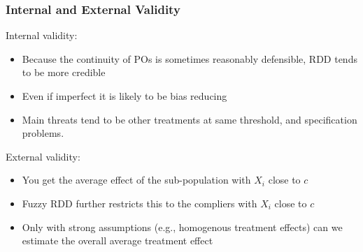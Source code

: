 \documentclass[xcolor=dvipsnames]{beamer}
\begin{document}
\begin{frame}
  \frametitle{Internal and External Validity}
  \small
   Internal validity:\\
  \footnotesize
  \begin{itemize}
  \item Because the continuity of POs is sometimes reasonably defensible, RDD tends to be more credible
  \item Even if imperfect it is likely to be bias reducing
  \item Main threats tend to be other treatments at same threshold, and specification problems.
  \end{itemize}
  \small
   External validity:\\
  \begin{itemize}
  \footnotesize
  	\item<3-> You get the average effect of the sub-population with $X_i$ close to $c$
	\item<3-> Fuzzy RDD further restricts this to the compliers with $X_i$ close to $c$
	\item<3-> Only with strong assumptions (e.g., homogenous treatment effects) can we estimate the overall average treatment effect
	 \end{itemize}
\end{frame}
\end{document}
